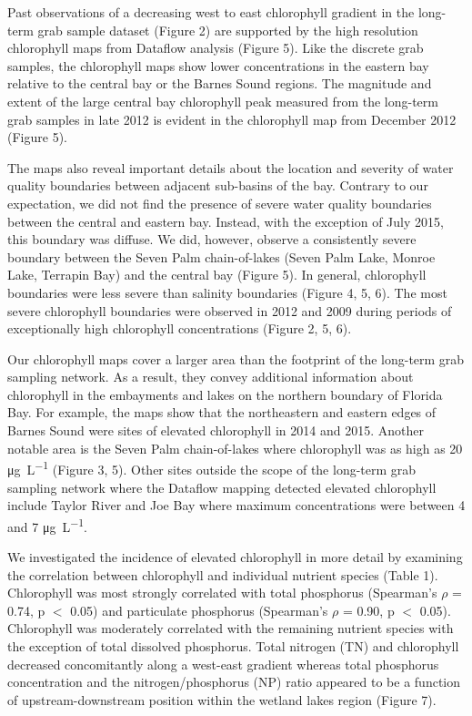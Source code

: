 Past observations of a decreasing west to east chlorophyll gradient in the long-term grab sample dataset (Figure 2) are supported by the high resolution chlorophyll maps from Dataflow analysis (Figure 5). Like the discrete grab samples, the chlorophyll maps show lower concentrations in the eastern bay relative to the central bay or the Barnes Sound regions. The magnitude and extent of the large central bay chlorophyll peak measured from the long-term grab samples in late 2012 is evident in the chlorophyll map from December 2012 (Figure 5). 

The maps also reveal important details about the location and severity of water quality boundaries between adjacent sub-basins of the bay. Contrary to our expectation, we did not find the presence of severe water quality boundaries between the central and eastern bay. Instead, with the exception of July 2015, this boundary was diffuse. We did, however, observe a consistently severe boundary between the Seven Palm chain-of-lakes (Seven Palm Lake, Monroe Lake, Terrapin Bay) and the central bay (Figure 5). In general, chlorophyll boundaries were less severe than salinity boundaries (Figure 4, 5, 6). The most severe chlorophyll boundaries were observed in 2012 and 2009 during periods of exceptionally high chlorophyll concentrations (Figure 2, 5, 6). 

Our chlorophyll maps cover a larger area than the footprint of the long-term grab sampling network. As a result, they convey additional information about chlorophyll in the embayments and lakes on the northern boundary of Florida Bay. For example, the maps show that the northeastern and eastern edges of Barnes Sound were sites of elevated chlorophyll in 2014 and 2015. Another notable area is the Seven Palm chain-of-lakes where chlorophyll was as high as 20 \si{\micro\gram\per\liter} (Figure 3, 5). Other sites outside the scope of the long-term grab sampling network where the Dataflow mapping detected elevated chlorophyll include Taylor River and Joe Bay where maximum concentrations were between 4 and 7 \si{\micro\gram\per\liter}. 

We investigated the incidence of elevated chlorophyll in more detail by examining the correlation between chlorophyll and individual nutrient species (Table 1). Chlorophyll was most strongly correlated with total phosphorus (Spearman's $\rho$ = 0.74, p $<$ 0.05) and particulate phosphorus (Spearman's $\rho$ = 0.90, p $<$ 0.05). Chlorophyll was moderately correlated with the remaining nutrient species with the exception of total dissolved phosphorus. Total nitrogen (TN) and chlorophyll decreased concomitantly along a west-east gradient whereas total phosphorus concentration and the nitrogen/phosphorus (NP) ratio appeared to be a function of upstream-downstream position within the wetland lakes region (Figure 7).  

